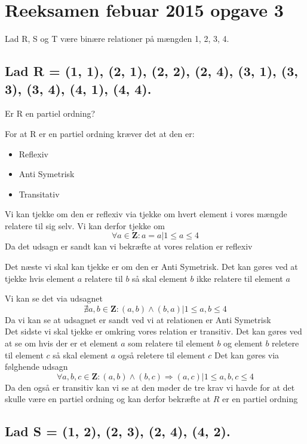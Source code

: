 \section{Reeksamen febuar 2015 opgave 3}

Lad R, S og T være binære relationer på mængden {1, 2, 3, 4}.

\subsection{Lad R = {(1, 1), (2, 1), (2, 2), (2, 4), (3, 1), (3, 3), (3, 4), (4, 1), (4, 4)}.}

Er R en partiel ordning?\newline

For at R er en partiel ordning kræver det at den er:
    \begin{itemize}  
         \item Reflexiv
         \item Anti Symetrisk
         \item Transitativ
    \end{itemize}

Vi kan tjekke om den er reflexiv via tjekke om hvert element i vores mængde relatere til sig selv.
Vi kan derfor tjekke om 
\[\forall a \in \textbf{Z} : a = a | 1 \leq a \leq 4\]
Da det udsagn er sandt kan vi bekræfte at vores relation er reflexiv\newline
    
Det næste vi skal kan tjekke er om den er Anti Symetrisk. Det kan gøres ved at tjekke hvis element $a$ relatere til $b$ så skal element $b$ ikke relatere til element $a$

Vi kan se det via udsagnet
\[\nexists a,b \in \textbf{Z} : (a,b) \wedge (b,a) | 1 \leq a,b \leq 4\]
Da vi kan se at udsagnet er sandt ved vi at relationen er Anti Symetrisk\\

Det sidste vi skal tjekke er omkring vores relation er transitiv. Det kan gøres ved at se om hvis der er et element $a$ som relatere til element $b$ og element $b$ reletere til element $c$ så skal element $a$ også reletere til element $c$
Det kan gøres via følghende udsagn
\[\forall a,b,c \in \textbf{Z} : (a,b) \wedge (b,c) \Rightarrow (a,c) | 1 \leq a,b,c \leq 4\]
Da den også er transitiv kan vi se at den møder de tre krav vi havde for at det skulle være en partiel ordning og kan derfor bekræfte at $R$ er en partiel ordning

\subsection{Lad S = {(1, 2), (2, 3), (2, 4), (4, 2)}.}


